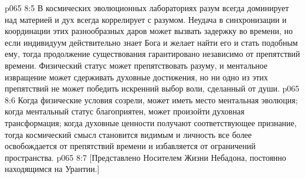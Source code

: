 \vs p065 8:5 \pc В космических эволюционных лабораториях разум всегда доминирует над материей и дух всегда коррелирует с разумом. Неудача в синхронизации и координации этих разнообразных даров может вызвать задержку во времени, но если индивидуум действительно знает Бога и желает найти его и стать подобным ему, тогда продолжение существования гарантировано независимо от препятствий времени. Физический статус может препятствовать разуму, и ментальное извращение может сдерживать духовные достижения, но ни одно из этих препятствий не может победить искренний выбор воли, сделанный от души.
\vs p065 8:6 Когда физические условия созрели, может иметь место  ментальная эволюция; когда ментальный статус благоприятен, может произойти  духовная трансформация; когда духовные ценности получают соответствующее признание, тогда космический смысл становится видимым и личность все более освобождается от препятствий времени и избавляется от ограничений пространства.
\vsetoff
\vs p065 8:7 [Представлено Носителем Жизни Небадона, постоянно находящимся на Урантии.]
